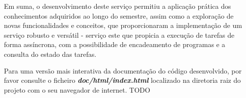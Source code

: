 \documentclass[a4paper,11pt]{scrreprt}
\begin{document}
    Em suma, o desenvolvimento deste serviço permitiu a aplicação prática
    dos conhecimentos adquiridos ao longo do semestre, assim como a
    exploração de novas funcionalidades e conceitos, que proporcionaram
    a implementação de um serviço robusto e versátil - serviço este que
    propicia a execução de tarefas de forma assíncrona, com a possibilidade de
    encadeamento de programas e a consulta do estado das tarefas.


%


    \quad Para uma versão mais interativa da documentação do código desenvolvido, por favor consulte o
    ficheiro \textbf{\textit{doc/html/index.html}} localizado na diretoria raiz do projeto com o seu
    navegador de internet. TODO


\end{document}
